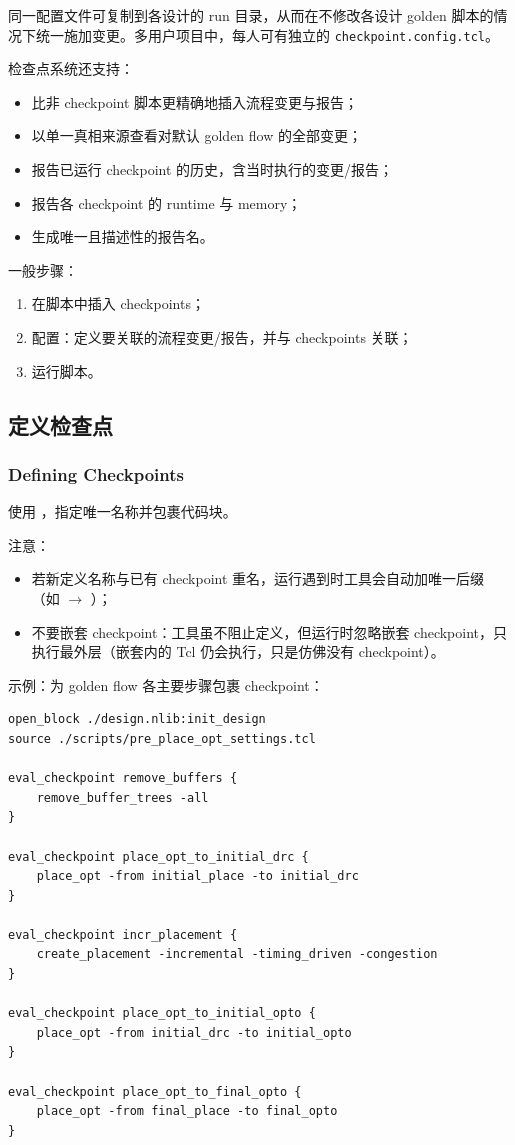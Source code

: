 同一配置文件可复制到各设计的 run 目录，从而在不修改各设计 golden 脚本的情况下统一施加变更。多用户项目中，每人可有独立的 \texttt{checkpoint.config.tcl}。

检查点系统还支持：
\begin{itemize}
  \item 比非 checkpoint 脚本更精确地插入流程变更与报告；
  \item 以单一真相来源查看对默认 golden flow 的全部变更；
  \item 报告已运行 checkpoint 的历史，含当时执行的变更/报告；
  \item 报告各 checkpoint 的 runtime 与 memory；
  \item 生成唯一且描述性的报告名。
\end{itemize}

一般步骤：
\begin{enumerate}
  \item 在脚本中插入 checkpoints；
  \item 配置：定义要关联的流程变更/报告，并与 checkpoints 关联；
  \item 运行脚本。
\end{enumerate}

\subsection{定义检查点}
\subsubsection*{Defining Checkpoints}

使用 ，指定唯一名称并包裹代码块。

注意：
\begin{itemize}
  \item 若新定义名称与已有 checkpoint 重名，运行遇到时工具会自动加唯一后缀（如  $\rightarrow$ ）；
  \item 不要嵌套 checkpoint：工具虽不阻止定义，但运行时忽略嵌套 checkpoint，只执行最外层（嵌套内的 Tcl 仍会执行，只是仿佛没有 checkpoint）。
\end{itemize}

示例：为 golden flow 各主要步骤包裹 checkpoint：
\begin{lstlisting}
open_block ./design.nlib:init_design
source ./scripts/pre_place_opt_settings.tcl

eval_checkpoint remove_buffers {
    remove_buffer_trees -all
}

eval_checkpoint place_opt_to_initial_drc {
    place_opt -from initial_place -to initial_drc
}

eval_checkpoint incr_placement {
    create_placement -incremental -timing_driven -congestion
}

eval_checkpoint place_opt_to_initial_opto {
    place_opt -from initial_drc -to initial_opto
}

eval_checkpoint place_opt_to_final_opto {
    place_opt -from final_place -to final_opto
}
\end{lstlisting}

